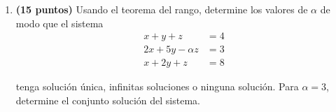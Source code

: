 \documentclass[a4paper]{article}
\begin{document}
\begin{enumerate}
    \item {\bf (15 puntos)} Usando el teorema del rango, determine los valores de $\alpha$ de modo que el sistema
    \begin{align*}
x + y +z &= 4 \\
2x + 5y - \alpha z &= 3\\
x + 2y +  z &= 8
\end{align*}

    tenga solución única, infinitas soluciones o ninguna solución. Para $\alpha=3$, determine el conjunto soluci\'on del sistema.
        
        









\end{enumerate}
\end{document}

